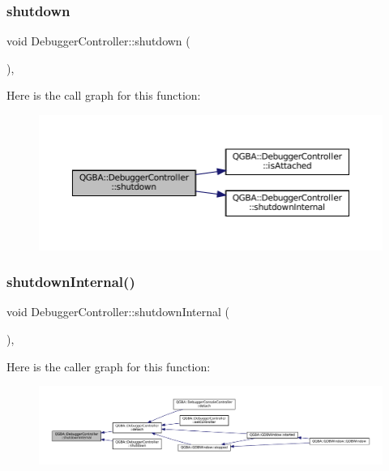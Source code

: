 \subsubsection{\texorpdfstring{shutdown}{shutdown}}
{\footnotesize\ttfamily void Debugger\+Controller\+::shutdown (\begin{DoxyParamCaption}{ }\end{DoxyParamCaption})\hspace{0.3cm}{\ttfamily [virtual]}, {\ttfamily [slot]}}

Here is the call graph for this function\+:
\nopagebreak
\begin{figure}[H]
\begin{center}
\leavevmode
\includegraphics[width=350pt]{class_q_g_b_a_1_1_debugger_controller_a63d465bde2ae7098a041e195e96e88e6_cgraph}
\end{center}
\end{figure}
\mbox{\label{class_q_g_b_a_1_1_debugger_controller_ade3fbd859c3e94ccfe057f5bb92ae054}} 
\subsubsection{\texorpdfstring{shutdown\+Internal()}{shutdownInternal()}}
{\footnotesize\ttfamily void Debugger\+Controller\+::shutdown\+Internal (\begin{DoxyParamCaption}{ }\end{DoxyParamCaption})\hspace{0.3cm}{\ttfamily [protected]}, {\ttfamily [virtual]}}

Here is the caller graph for this function\+:
\nopagebreak
\begin{figure}[H]
\begin{center}
\leavevmode
\includegraphics[width=350pt]{class_q_g_b_a_1_1_debugger_controller_ade3fbd859c3e94ccfe057f5bb92ae054_icgraph}
\end{center}
\end{figure}


